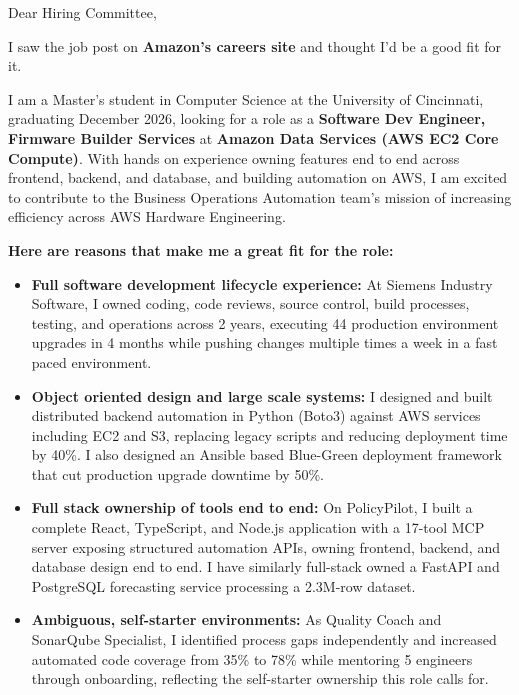 \documentclass[11pt]{letter}
\date{}
\begin{document}
\begin{letter}{}

\opening{Dear Hiring Committee,}

I saw the job post on \textbf{Amazon's careers site} and thought I'd be a good fit for it.

I am a Master's student in Computer Science at the University of Cincinnati, graduating December 2026, looking for a role as a \textbf{Software Dev Engineer, Firmware Builder Services} at \textbf{Amazon Data Services (AWS EC2 Core Compute)}. With hands on experience owning features end to end across frontend, backend, and database, and building automation on AWS, I am excited to contribute to the Business Operations Automation team's mission of increasing efficiency across AWS Hardware Engineering.

\textbf{Here are reasons that make me a great fit for the role:}

\begin{itemize}[leftmargin=*, itemsep=0.45em]
    \item \textbf{Full software development lifecycle experience:} At Siemens Industry Software, I owned coding, code reviews, source control, build processes, testing, and operations across 2 years, executing 44 production environment upgrades in 4 months while pushing changes multiple times a week in a fast paced environment.

    \item \textbf{Object oriented design and large scale systems:} I designed and built distributed backend automation in Python (Boto3) against AWS services including EC2 and S3, replacing legacy scripts and reducing deployment time by 40\%. I also designed an Ansible based Blue-Green deployment framework that cut production upgrade downtime by 50\%.

    \item \textbf{Full stack ownership of tools end to end:} On PolicyPilot, I built a complete React, TypeScript, and Node.js application with a 17-tool MCP server exposing structured automation APIs, owning frontend, backend, and database design end to end. I have similarly full-stack owned a FastAPI and PostgreSQL forecasting service processing a 2.3M-row dataset.

    \item \textbf{Ambiguous, self-starter environments:} As Quality Coach and SonarQube Specialist, I identified process gaps independently and increased automated code coverage from 35\% to 78\% while mentoring 5 engineers through onboarding, reflecting the self-starter ownership this role calls for.
\end{itemize}


\end{letter}
\end{document}
